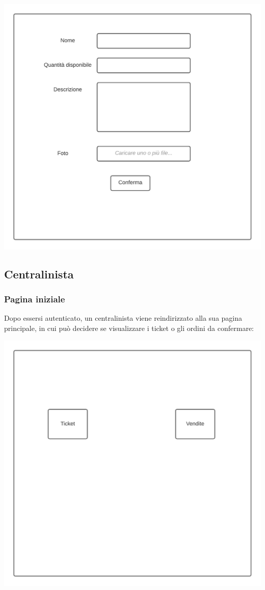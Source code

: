 \documentclass[12pt]{article}
\begin{document}
\begin{center}
\includegraphics[height=0.3\textheight]{Mockup/Cliente/NuovaVendita}
\end{center}

\newpage

\subsection{Centralinista}
\subsubsection{Pagina iniziale}
Dopo essersi autenticato, un centralinista viene reindirizzato alla sua pagina principale, in cui può decidere se visualizzare i ticket o gli ordini da confermare:
\begin{center}
\includegraphics[height=0.3\textheight]{Mockup/Centralinista/PaginaIniziale}
\end{center}
\end{document}
